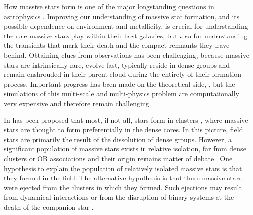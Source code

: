 \documentclass[apjl,twocolumn]{emulateapj}
\begin{document}
How massive stars form is one of the major longstanding questions in astrophysics
\citep[e.g.,][]{zinnecker:07}. Improving our understanding of massive star formation, and its
possible dependence on environment and metallicity, is crucial for understanding the role massive stars play within their host galaxies, but also for understanding the transients that mark their death and the compact remnants they leave behind.
%
Obtaining clues from observations has been challenging, because massive stars are intrinsically rare, 
evolve fast, typically reside in dense groups and remain enshrouded in
their parent cloud during the entirety of their formation
process. Important progress has been made on the theoretical side,
\citep[e.g.][]{bate:09,kuiper:15,rosen:16}, but the simulations of this multi-scale and multi-physics problem are computationally very expensive and therefore remain challenging.  

In has been proposed that most, if not all, stars form in clusters \citep{lada:03}, where massive stars are thought to  form preferentially in the dense cores. In this picture, field stars are primarily the result of the dissolution of dense groups.  However, a significant population of massive stars exists in relative isolation, far from dense clusters or OB associations and their origin remains matter of debate \citep{gvaramadze:12, lamb:16,ward:18}.   One hypothesis to explain the population of relatively isolated massive stars is that they formed in the field. The alternative hypothesis is that these massive stars were ejected from the clusters in which they formed.  Such ejections may result from dynamical interactions \citep[e.g.,][]{poveda:67} or from the disruption of binary systems at the death of the companion  star \citep[e.g.,][]{zwicky:57, blaauw:61, renzo:18}. 
 
\end{document}
